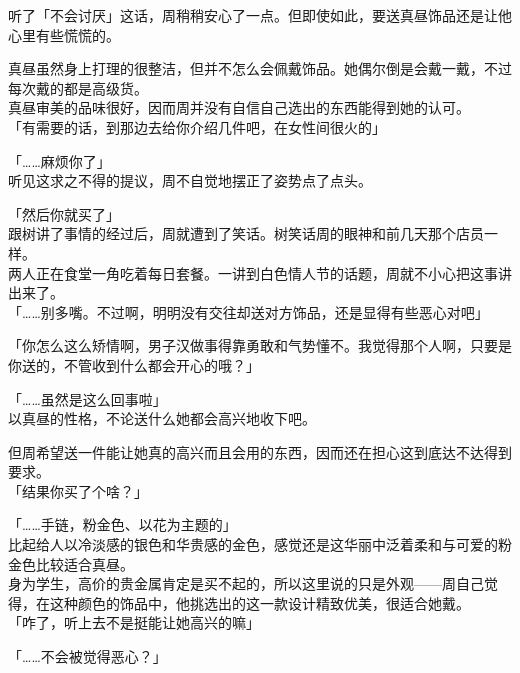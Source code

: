 听了「不会讨厌」这话，周稍稍安心了一点。但即使如此，要送真昼饰品还是让他心里有些慌慌的。

真昼虽然身上打理的很整洁，但并不怎么会佩戴饰品。她偶尔倒是会戴一戴，不过每次戴的都是高级货。\\

真昼审美的品味很好，因而周并没有自信自己选出的东西能得到她的认可。\\

「有需要的话，到那边去给你介绍几件吧，在女性间很火的」

「……麻烦你了」\\

听见这求之不得的提议，周不自觉地摆正了姿势点了点头。\\

\vspace{2\baselineskip}

「然后你就买了」\\

跟树讲了事情的经过后，周就遭到了笑话。树笑话周的眼神和前几天那个店员一样。\\

两人正在食堂一角吃着每日套餐。一讲到白色情人节的话题，周就不小心把这事讲出来了。\\

「……别多嘴。不过啊，明明没有交往却送对方饰品，还是显得有些恶心对吧」

「你怎么这么矫情啊，男子汉做事得靠勇敢和气势懂不。我觉得那个人啊，只要是你送的，不管收到什么都会开心的哦？」

「……虽然是这么回事啦」\\

以真昼的性格，不论送什么她都会高兴地收下吧。

但周希望送一件能让她真的高兴而且会用的东西，因而还在担心这到底达不达得到要求。\\

「结果你买了个啥？」

「……手链，粉金色、以花为主题的」\\

比起给人以冷淡感的银色和华贵感的金色，感觉还是这华丽中泛着柔和与可爱的粉金色比较适合真昼。\\

身为学生，高价的贵金属肯定是买不起的，所以这里说的只是外观——周自己觉得，在这种颜色的饰品中，他挑选出的这一款设计精致优美，很适合她戴。\\

「咋了，听上去不是挺能让她高兴的嘛」

「……不会被觉得恶心？」

